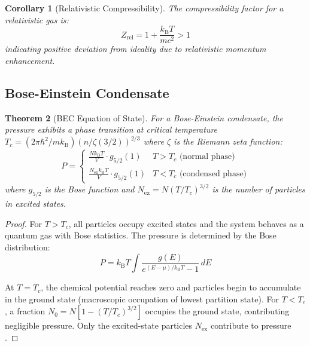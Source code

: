 \documentclass[11pt,twocolumn,a4paper]{article}
\newtheorem{theorem}{Theorem}[section]
\newtheorem{corollary}[theorem]{Corollary}
\theoremstyle{definition}
\theoremstyle{remark}
\newcommand{\kB}{k_{\mathrm{B}}}
\begin{document}
\begin{corollary}[Relativistic Compressibility]
\label{cor:relativistic_compressibility}
The compressibility factor for a relativistic gas is:
\begin{equation}
Z_{\mathrm{rel}} = 1 + \frac{\kB T}{mc^2} > 1
\label{eq:relativistic_compressibility}
\end{equation}
indicating positive deviation from ideality due to relativistic momentum enhancement.
\end{corollary}

\subsection{Bose-Einstein Condensate}

\begin{theorem}[BEC Equation of State]
\label{thm:bec_eos}
For a Bose-Einstein condensate, the pressure exhibits a phase transition at critical temperature $T_c = (2\pi\hbar^2/m\kB)(n/\zeta(3/2))^{2/3}$ where $\zeta$ is the Riemann zeta function:
\begin{equation}
P = \begin{cases}
\displaystyle \frac{N\kB T}{V} \cdot g_{5/2}(1) & T > T_c \text{ (normal phase)} \\[10pt]
\displaystyle \frac{N_{\mathrm{ex}}\kB T}{V} \cdot g_{5/2}(1) & T < T_c \text{ (condensed phase)}
\end{cases}
\label{eq:bec_eos}
\end{equation}
where $g_{5/2}$ is the Bose function and $N_{\mathrm{ex}} = N(T/T_c)^{3/2}$ is the number of particles in excited states.
\end{theorem}

\begin{proof}
For $T > T_c$, all particles occupy excited states and the system behaves as a quantum gas with Bose statistics. The pressure is determined by the Bose distribution:
\begin{equation}
P = \kB T \int \frac{g(E)}{e^{(E-\mu)/\kB T} - 1} \, dE
\end{equation}

At $T = T_c$, the chemical potential reaches zero and particles begin to accumulate in the ground state (macroscopic occupation of lowest partition state). For $T < T_c$, a fraction $N_0 = N[1 - (T/T_c)^{3/2}]$ occupies the ground state, contributing negligible pressure. Only the excited-state particles $N_{\mathrm{ex}}$ contribute to pressure \citep{landau1980statistical,pathria2011statistical}.
\end{proof}
\end{document}
